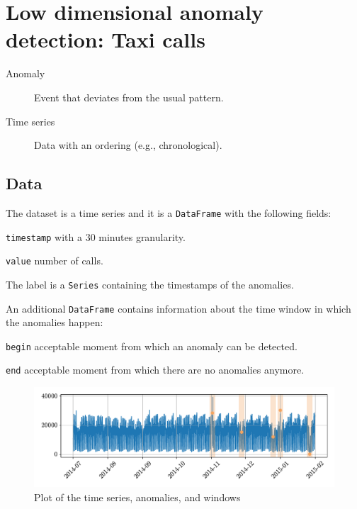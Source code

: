 \chapter{Low dimensional anomaly detection: Taxi calls} \label{ch:ad_low}

\begin{description}
    \item[Anomaly] 
        Event that deviates from the usual pattern.

    \item[Time series] 
        Data with an ordering (e.g., chronological).
\end{description}



\section{Data}

The dataset is a time series and it is a \texttt{DataFrame} with the following fields:
\begin{descriptionlist}
    \item[\texttt{timestamp}] with a 30 minutes granularity.
    \item[\texttt{value}] number of calls.
\end{descriptionlist}

The label is a \texttt{Series} containing the timestamps of the anomalies.

An additional \texttt{DataFrame} contains information about the time window in which the anomalies happen:
\begin{descriptionlist}
    \item[\texttt{begin}] acceptable moment from which an anomaly can be detected.
    \item[\texttt{end}] acceptable moment from which there are no anomalies anymore.
\end{descriptionlist}

\begin{figure}[H]
    \centering
    \includegraphics[width=0.7\linewidth]{./img/_ad_taxi_data.pdf}
    \caption{Plot of the time series, anomalies, and windows}
\end{figure}



